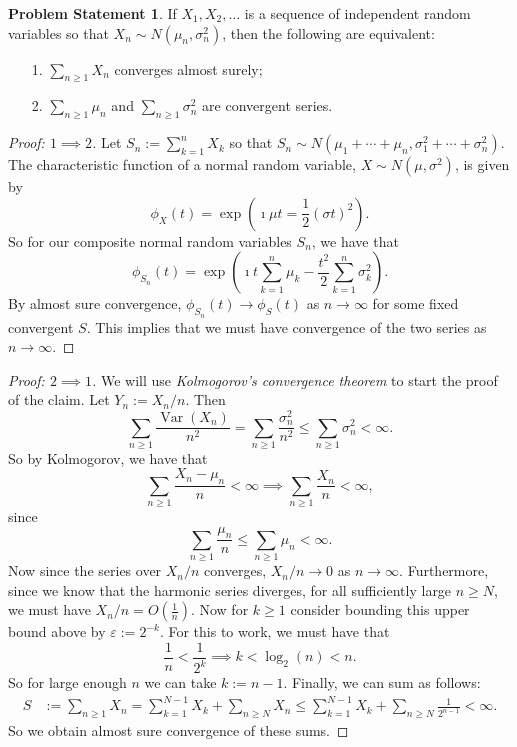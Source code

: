 \documentclass[12pt,reqno]{article}
\renewcommand{\emph}[1]{\textit{#1}}
\theoremstyle{plain}
\theoremstyle{definition}
\newtheorem{problem}[theorem]{Problem Statement}
\begin{document}
\begin{problem}
If $X_1,X_2,\ldots$ is a sequence of independent random variables so that 
$X_n \sim N(\mu_n, \sigma_n^2)$, then the following are equivalent:
\begin{itemize} 

\item[1.] $\sum_{n \geq 1} X_n$ converges almost surely; 
\item[2.] $\sum_{n \geq 1} \mu_n$ and $\sum_{n \geq 1} \sigma_n^2$ are 
     convergent series. 

\end{itemize} 
\end{problem}
\begin{proof}[Proof: $1 \implies 2$]
Let $S_n := \sum_{k=1}^n X_k$ so that 
$S_n \sim N(\mu_1+\cdots+\mu_n, \sigma_1^2+\cdots+\sigma_n^2)$. 
The characteristic function of a normal random variable, 
$X \sim N(\mu, \sigma^2)$, is given by 
\[
\phi_X(t) = \exp\left(\imath \mu t = \frac{1}{2}(\sigma t)^2\right). 
\]
So for our composite normal random variables $S_n$, we have that 
\[
\phi_{S_n}(t) = \exp\left(\imath t \sum_{k=1}^n \mu_k - \frac{t^2}{2} 
     \sum_{k=1}^n \sigma_k^2\right). 
\]
By almost sure convergence, $\phi_{S_n}(t) \rightarrow \phi_S(t)$ as 
$n \rightarrow \infty$ for some fixed convergent $S$. This implies that we 
must have convergence of the two series as $n \rightarrow \infty$. 
\end{proof} 
\begin{proof}[Proof: $2 \implies 1$]
We will use \emph{Kolmogorov's convergence theorem} to start the proof of the 
claim. Let $Y_n := X_n / n$. Then 
\[
\sum_{n \geq 1} \frac{\operatorname{Var}(X_n)}{n^2} = 
     \sum_{n \geq 1} \frac{\sigma_n^2}{n^2} \leq 
     \sum_{n \geq 1} \sigma_n^2 < \infty. 
\]
So by Kolmogorov, we have that 
\[
\sum_{n \geq 1} \frac{X_n-\mu_n}{n} < \infty \implies 
     \sum_{n \geq 1} \frac{X_n}{n} < \infty, 
\]
since 
\[
\sum_{n \geq 1} \frac{\mu_n}{n} \leq \sum_{n \geq 1} \mu_n < \infty. 
\]
Now since the series over $X_n / n$ converges, $X_n / n \rightarrow 0$ 
as $n \rightarrow \infty$. Furthermore, since we know that the harmonic 
series diverges, for all sufficiently large $n \geq N$, we must have 
$X_n / n = O(\frac{1}{n})$. Now for $k \geq 1$ consider bounding this 
upper bound above by $\varepsilon := 2^{-k}$. For this to work, we must 
have that 
\[
\frac{1}{n} < \frac{1}{2^k} \implies k < \log_2(n) < n. 
\]
So for large enough $n$ we can take $k := n-1$. 
Finally, we can sum as follows: 
\begin{align*} 
S & := \sum_{n \geq 1} X_n = \sum_{k=1}^{N-1} X_k + \sum_{n \geq N} X_n 
     \leq \sum_{k=1}^{N-1} X_k + \sum_{n \geq N} \frac{1}{2^{n-1}} 
     < \infty. 
\end{align*} 
So we obtain almost sure convergence of these sums. 
\end{proof} 
\end{document}
